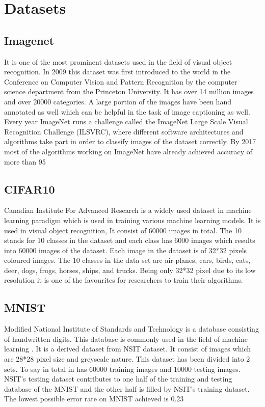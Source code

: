 \documentclass[titlepage]{report}
\begin{document}
\pagebreak


\section{Datasets}

\subsection{Imagenet}
It is one of the most prominent datasets used in the field of visual object recognition. In 2009 this dataset was first introduced to the world in the Conference on Computer Vision and Pattern Recognition by the computer science department from the Princeton University. It has over 14 million images and over 20000 categories. A large portion of the images have been hand annotated as well which can be helpful in the task of image captioning as well. Every year ImageNet runs a challenge called the ImageNet Large Scale Visual Recognition Challenge (ILSVRC), where different software architectures and algorithms take part in order to classify images of the dataset correctly. By 2017 most of the algorithms working on ImageNet have already achieved accuracy of more than 95%

\subsection{CIFAR10}
Canadian Institute For Advanced Research is a widely used dataset in machine learning paradigm which is used in training various machine learning models. It is used in visual object recognition, It consist of 60000 images in total. The 10 stands for 10 classes in the dataset and each class has 6000 images which results into 60000 images of the dataset. Each image in the dataset is of 32*32 pixels coloured images. The 10 classes in the data set are air-planes, cars, birds, cats, deer, dogs, frogs, horses, ships, and trucks. Being only 32*32 pixel due to its low resolution it is one of the favourites for researchers to train their algorithms. 

\subsection{MNIST}
Modified National Institute of Standards and Technology is a database consisting of handwritten digits. This database is commonly used in the field of machine learning . It is a derived dataset from NSIT dataset. It consist of images which are 28*28 pixel size and greyscale nature. This dataset has been divided into 2 sets. To say in total in has 60000 training images and 10000 testing images. NSIT’s testing dataset contributes to one half of the training and testing database of the MNIST and the other half is filled by NSIT’s training dataset. The lowest possible error rate on MNIST achieved is 0.23%
\end{document}
